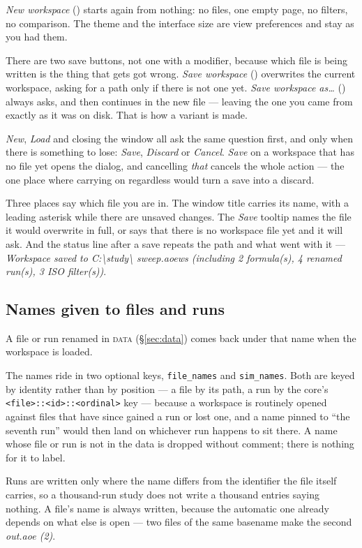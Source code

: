 \documentclass[11pt,a4paper,oneside]{report}
\newcommand{\code}[1]{\texttt{#1}}
\newcommand{\key}[1]{\textsf{\small\fbox{#1}}}
\newcommand{\tab}[1]{\textsc{#1}}
\begin{document}
\emph{New workspace} (\key{Ctrl+N}) starts again from nothing: no files, one
empty page, no filters, no comparison. The theme and the interface size are
view preferences and stay as you had them.

There are two save buttons, not one with a modifier, because which file is being
written is the thing that gets got wrong. \emph{Save workspace} (\key{Ctrl+S})
overwrites the current workspace, asking for a path only if there is not one yet.
\emph{Save workspace as\ldots} (\key{Ctrl+Shift+S}) always asks, and then
continues in the new file --- leaving the one you came from exactly as it was on
disk. That is how a variant is made.

\emph{New}, \emph{Load} and closing the window all ask the same question
first, and only when there is something to lose: \emph{Save}, \emph{Discard}
or \emph{Cancel}. \emph{Save} on a workspace that has no file yet opens the
dialog, and cancelling \emph{that} cancels the whole action --- the one place
where carrying on regardless would turn a save into a discard.

Three places say which file you are in. The window title carries its name, with a
leading asterisk while there are unsaved changes. The \emph{Save} tooltip names
the file it would overwrite in full, or says that there is no workspace file yet
and it will ask. And the status line after a save repeats the path and what went
with it --- \emph{Workspace saved to C:\textbackslash study\textbackslash
sweep.aoews (including 2 formula(s), 4 renamed run(s), 3 ISO filter(s))}.

\subsection{Names given to files and runs}

A file or run renamed in \tab{data} (\S\ref{sec:data}) comes back under that
name when the workspace is loaded.

The names ride in two optional keys, \code{file\_names} and \code{sim\_names}.
Both are keyed by identity rather than by position --- a file by its path, a run
by the core's \code{<file>::<id>::<ordinal>} key --- because a workspace is
routinely opened against files that have since gained a run or lost one, and a
name pinned to ``the seventh run'' would then land on whichever run happens to sit
there. A name whose file or run is not in the data is dropped without comment;
there is nothing for it to label.

Runs are written only where the name differs from the identifier the file itself
carries, so a thousand-run study does not write a thousand entries saying
nothing. A file's name is always written, because the automatic one already
depends on what else is open --- two files of the same basename make the second
\emph{out.aoe (2)}.
\end{document}
